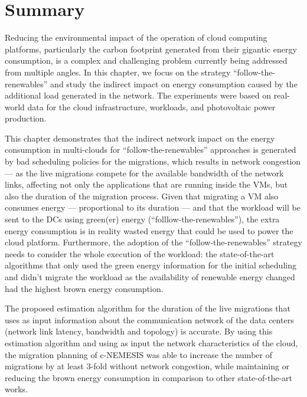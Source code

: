 \section{Summary} \label{sec:conclusion_smargreens}


Reducing the environmental impact of the operation of cloud computing platforms, particularly the carbon footprint generated from their gigantic energy consumption, is a complex and challenging problem currently being addressed from multiple angles. In this chapter, we focus on the strategy ``follow-the-renewables'' and study the indirect impact on energy consumption caused by the additional load generated in the network. The experiments were based on real-world data for the cloud infrastructure, workloads, and photovoltaic power production.

This chapter demonstrates that the indirect network impact on the energy consumption in multi-clouds for ``follow-the-renewables'' approaches is generated by bad scheduling policies for the migrations, which results in network congestion --- as the live migrations compete for the available bandwidth of the network links, affecting not only the applications that are running inside the VMs, but also the duration of the migration process. Given that migrating a VM also consumes energy --- proportional to its duration --- and that the workload will be sent to the DCs using green(er) energy (``folllow-the-renewables''), the extra energy consumption is in reality wasted energy that could be used to power the cloud platform. Furthermore, the adoption of the ``follow-the-renewables'' strategy needs to consider the whole execution of the workload:  the state-of-the-art algorithms that only used the green energy information for the initial scheduling and didn't migrate the workload as the availability of renewable energy changed had the highest brown energy consumption.

The proposed estimation algorithm for the duration of the live migrations that uses as input information about the communication network of the data centers (network link latency, bandwidth and topology) is accurate. By using this estimation algorithm and using as input the network characteristics of the cloud, the migration planning of c-NEMESIS was able to increase the number of migrations by at least 3-fold without network congestion, while maintaining or reducing the brown energy consumption in comparison to other state-of-the-art works.

